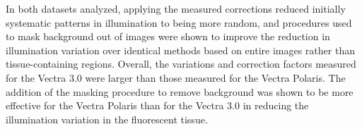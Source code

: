 \documentclass[letterpaper,11pt]{article}
\begin{document}
In both datasets analyzed, applying the measured corrections reduced initially systematic patterns in illumination to being more random, and procedures used to mask background out of images were shown to improve the reduction in illumination variation over identical methods based on entire images rather than tissue-containing regions. Overall, the variations and correction factors measured for the Vectra 3.0 were larger than those measured for the Vectra Polaris. The addition of the masking procedure to remove background was shown to be more effective for the Vectra Polaris than for the Vectra 3.0 in reducing the illumination variation in the fluorescent tissue.

\clearpage

\end{document}
